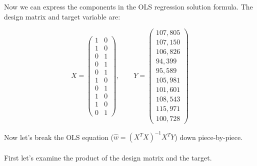Now we can express the components in the OLS regression solution formula.  The
design matrix and target variable are:

\[
X = \left(\begin{array}{cc}
          1  &  0 \\ 
          1  &  0 \\ 
          0  &  1 \\ 
          0  &  1 \\ 
          0  &  1 \\ 
          1  &  0 \\ 
          0  &  1 \\ 
          1  &  0 \\ 
          1  &  0 \\ 
          0  &  1
\end{array}\right)
,
\quad\quad
Y = \left(\begin{array}{c}
         107,805 \\ 
         107,150 \\ 
         106,826 \\ 
          94,399 \\ 
          95,589 \\ 
         105,981 \\ 
         101,601 \\ 
         108,543 \\ 
         115,971 \\ 
         100,728 
\end{array}\right)
\] 

Now let's break the OLS equation ($\hat{w} = (X^T X)^{-1} X^T Y $) down
piece-by-piece. \\
\\
First let's examine the product of the design matrix and the target.

